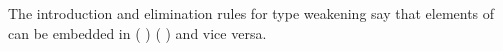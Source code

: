 \begin{AgdaAlign}
The introduction and elimination rules for type weakening say that
elements of   can be embedded in  (
) ( ) and vice versa.
\begin{code}%
%
\>[4]\AgdaSpace{}%
\AgdaSymbol{:}\AgdaSpace{}%
\AgdaSymbol{\{}\AgdaSpace{}%
\AgdaSymbol{:}\AgdaSpace{}%
\AgdaSpace{}%
\AgdaSymbol{\}}\AgdaSpace{}%
\AgdaSymbol{\{}\AgdaSpace{}%
\AgdaSymbol{:}\AgdaSpace{}%
\AgdaSpace{}%
\AgdaSymbol{\}}\AgdaSpace{}%
\AgdaSpace{}%
\AgdaSpace{}%
\AgdaSpace{}%
\AgdaSpace{}%
\AgdaSpace{}%
\AgdaSpace{}%
\AgdaSymbol{(}\AgdaSpace{}%
\AgdaSymbol{)}\AgdaSpace{}%
\AgdaSymbol{(}\AgdaSpace{}%
\AgdaSymbol{)}\<%
\\
%
\>[4]\AgdaSpace{}%
\AgdaSymbol{:}\AgdaSpace{}%
\AgdaSymbol{\{}\AgdaSpace{}%
\AgdaSymbol{:}\AgdaSpace{}%
\AgdaSpace{}%
\AgdaSymbol{\}}\AgdaSpace{}%
\AgdaSymbol{\{}\AgdaSpace{}%
\AgdaSymbol{:}\AgdaSpace{}%
\AgdaSpace{}%
\AgdaSymbol{\}}\AgdaSpace{}%
\AgdaSpace{}%
\AgdaSpace{}%
\AgdaSymbol{(}\AgdaSpace{}%
\AgdaSymbol{)}\AgdaSpace{}%
\AgdaSymbol{(}\AgdaSpace{}%
\AgdaSymbol{)}\AgdaSpace{}%
\AgdaSpace{}%
\AgdaSpace{}%
\AgdaSpace{}%
\<%
\end{code}


\end{AgdaAlign}
